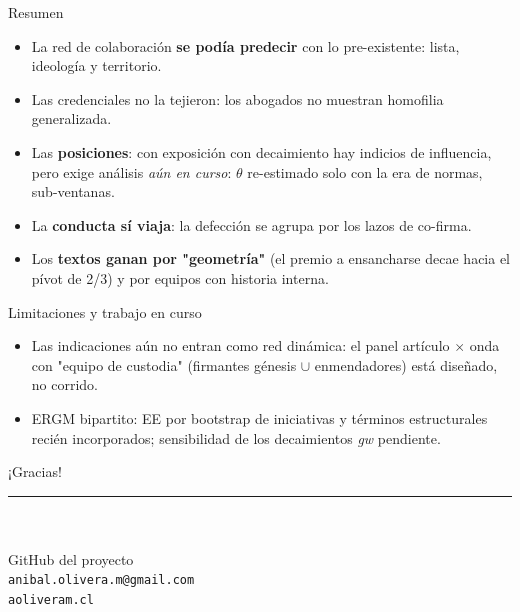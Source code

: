 \documentclass[aspectratio=169,11pt]{beamer}
\newcommand{\emphr}[1]{{\color{ndreddark}\textbf{#1}}}
\begin{document}
\begin{frame}{Resumen}
\begin{itemize}
  \item La red de colaboración \emphr{se podía predecir} con lo pre-existente: lista, ideología y territorio. 
  \vspace{0.25cm}
  \item Las credenciales no la tejieron: los abogados no muestran homofilia generalizada.
  \vspace{0.25cm}
  \item Las \emphr{posiciones}: con exposición con decaimiento hay indicios de influencia, pero exige análisis \emph{aún en curso}: $\theta$ re-estimado solo con la era de normas, sub-ventanas.
  \vspace{0.25cm}
  \item La \emphr{conducta sí viaja}: la defección se agrupa por los lazos de co-firma.
  \vspace{0.25cm}
  \item Los \emphr{textos ganan por "geometría"} (el premio a ensancharse decae hacia el pívot de 2/3) y por equipos con historia interna.
\end{itemize}
\end{frame}

\begin{frame}{Limitaciones y trabajo en curso}
\begin{itemize}
  \item Las indicaciones aún no entran como red dinámica: el panel artículo $\times$ onda con "equipo de custodia" (firmantes génesis $\cup$ enmendadores) está diseñado, no corrido.
  \vspace{0.25cm}
  \item ERGM bipartito: EE por bootstrap de iniciativas y términos estructurales recién incorporados; sensibilidad de los decaimientos \emph{gw} pendiente.
\end{itemize}
\end{frame}

\begin{frame}[plain]
  \vfill
  \begin{center}
    {\Large ¡Gracias!}\\[2pt]
    {\color{ndred}\rule{0.30\textwidth}{1.1pt}}\\[0.7cm]
    \\[6pt]
    {\small GitHub del proyecto}\\[0.7cm]
    {\texttt{anibal.olivera.m@gmail.com}}\\[2pt]
    {\texttt{aoliveram.cl}}
  \end{center}
  \vfill
\end{frame}
\end{document}
